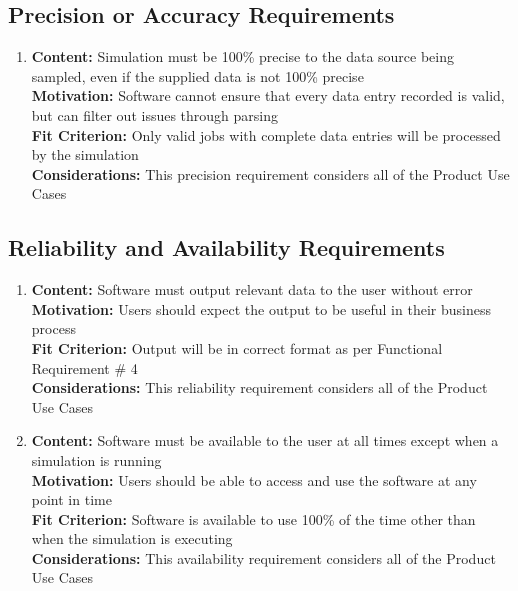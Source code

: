 \documentclass[paper=letter, fontsize=10pt]{scrartcl}
\numberwithin{equation}{section}		%
\numberwithin{figure}{section}			%
\numberwithin{table}{section}				%
\begin{document}
\subsection{Precision or Accuracy Requirements}
\begin{enumerate}
	\item \textbf{Content:} Simulation must be 100\% precise to the data source being sampled, even if the supplied data is not 100\% precise 
	\\	  \textbf{Motivation:} Software cannot ensure that every data entry recorded is valid, but can filter out issues through parsing
	\\	  \textbf{Fit Criterion:} Only valid jobs with complete data entries will be processed by the simulation
	\\	  \textbf{Considerations:} This precision requirement considers all of the Product Use Cases
\end{enumerate}
\subsection{Reliability and Availability Requirements}
	\begin{enumerate}
		\item \textbf{Content:} Software must output relevant data to the user without error
		\\	  \textbf{Motivation:} Users should expect the output to be useful in their business process
		\\	  \textbf{Fit Criterion:} Output will be in correct format as per Functional Requirement \# 4
		\\	  \textbf{Considerations:} This reliability requirement considers all of the Product Use Cases 
		\item \textbf{Content:} Software must be available to the user at all times except when a simulation is running
		\\	  \textbf{Motivation:} Users should be able to access and use the software at any point in time
		\\	  \textbf{Fit Criterion:} Software is available to use 100\% of the time other than when the simulation is executing
		\\	  \textbf{Considerations:} This availability requirement considers all of the Product Use Cases 
	\end{enumerate}
\end{document}
